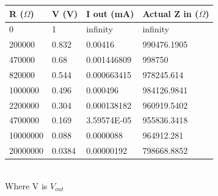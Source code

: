 \documentclass{article}
\begin{document}
\begin{itemize}
\begin{table}[h]
\begin{tabular}{llll}
    \textbf{R ($\Omega$)} & \textbf{V (V)} & \textbf{I out (mA)} & \textbf{Actual Z in ($\Omega$)} \\ \hline
    0                     & 1              & infinity            & infinity                        \\
    200000                & 0.832          & 0.00416             & 990476.1905                     \\
    470000                & 0.68           & 0.001446809         & 998750                          \\
    820000                & 0.544          & 0.000663415         & 978245.614                      \\
    1000000               & 0.496          & 0.000496            & 984126.9841                     \\
    2200000               & 0.304          & 0.000138182         & 960919.5402                     \\
    4700000               & 0.169          & 3.59574E-05         & 955836.3418                     \\
    10000000              & 0.088          & 0.0000088           & 964912.281                      \\
    20000000              & 0.0384         & 0.00000192          & 798668.8852                    
    \end{tabular}
    \end{table} \\Where V is $V_{out}$


\end{itemize}
\end{document}
